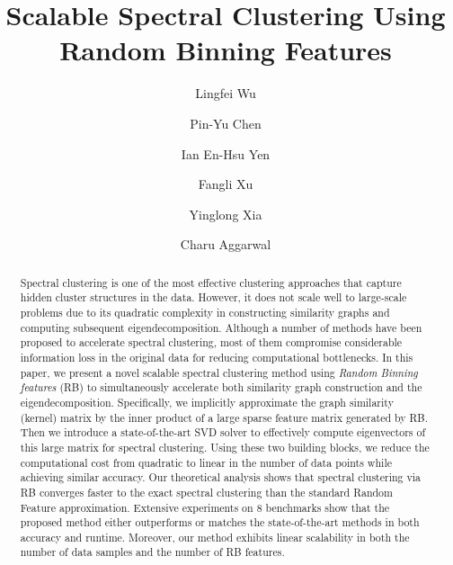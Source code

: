 \documentclass[sigconf]{acmart}
\newcommand{\1}{\boldsymbol{1}}
\newcommand{\0}{\boldsymbol{0}}
\begin{document}
\title{Scalable Spectral Clustering Using Random Binning Features}




\author{Lingfei Wu}

\author{Pin-Yu Chen}

\author{ Ian En-Hsu Yen}

\author{Fangli Xu }

\author{Yinglong Xia}

\author{Charu Aggarwal}

\renewcommand{\shortauthors}{Lingfei Wu, Pin-Yu Chen, Ian En-Hsu Yen, et al.}


\begin{abstract}
Spectral clustering is one of the most effective clustering approaches that capture hidden cluster structures in the data. However, it does not scale well to large-scale problems due to its quadratic complexity in constructing similarity graphs and computing subsequent eigendecomposition. Although a number of methods have been proposed to accelerate spectral clustering, most of them compromise considerable information loss in the original data for reducing computational bottlenecks. In this paper, we present a novel scalable spectral clustering method using \emph{Random Binning features} (RB) to simultaneously accelerate both similarity graph construction and the eigendecomposition. Specifically, we  implicitly approximate the graph similarity (kernel) matrix by the inner product of a large sparse feature matrix generated by RB. Then we introduce a state-of-the-art SVD solver to effectively compute eigenvectors of this large matrix for spectral clustering. Using these two building blocks, we reduce the computational cost from quadratic to linear in the number of data points while achieving similar accuracy. Our theoretical analysis shows that spectral clustering via RB converges faster to the exact spectral clustering than the standard Random Feature approximation. Extensive experiments on 8 benchmarks show that the proposed method either  outperforms or matches the state-of-the-art methods in both accuracy and runtime. Moreover, our method exhibits linear scalability in both the number of data samples and the number of RB features.
\end{abstract}
\end{document}
